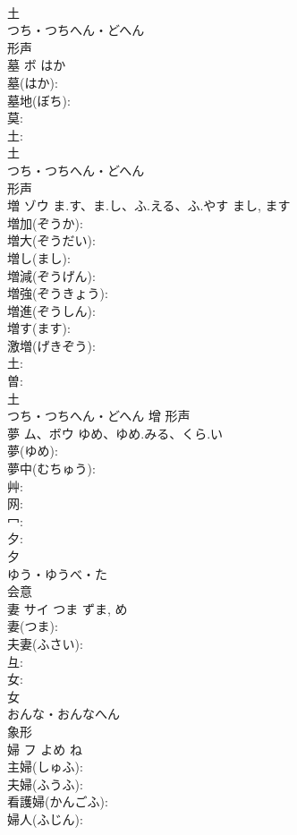\documentclass[8pt]{extreport}
\begin{document}
\begin{CJK}{UTF8}{min}
\\	土	
\\	つち・つちへん・どへん	
\\	形声 
\\	墓	ボ	はか		
\\	墓(はか): 
\\	墓地(ぼち): 
\\	莫: 
\\	土: 
\\	土	
\\	つち・つちへん・どへん	
\\	形声 
\\	増	ゾウ	ま.す、ま.し、ふ.える、ふ.やす	まし, ます	
\\	増加(ぞうか): 
\\	増大(ぞうだい): 
\\	増し(まし): 
\\	増減(ぞうげん): 
\\	増強(ぞうきょう): 
\\	増進(ぞうしん): 
\\	増す(ます): 
\\	激増(げきぞう): 
\\	土: 
\\	曽: 
\\	土	
\\	つち・つちへん・どへん	增	形声 
\\	夢	ム、ボウ	ゆめ、ゆめ.みる、くら.い		
\\	夢(ゆめ): 
\\	夢中(むちゅう): 
\\	艸: 
\\	网: 
\\	冖: 
\\	夕: 
\\	夕	
\\	ゆう・ゆうべ・た	
\\	会意 
\\	妻	サイ	つま	ずま, め	
\\	妻(つま): 
\\	夫妻(ふさい): 
\\	彑: 
\\	女: 
\\	女	
\\	おんな・おんなへん	
\\	象形 
\\	婦	フ	よめ	ね	
\\	主婦(しゅふ): 
\\	夫婦(ふうふ): 
\\	看護婦(かんごふ): 
\\	婦人(ふじん): 

\end{CJK}
\end{document}

